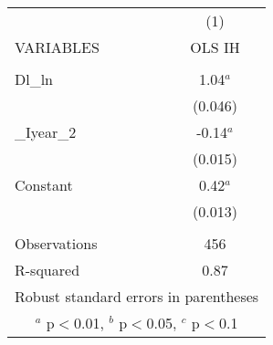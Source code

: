 \documentclass[]{article}
\begin{document}
\begin{tabular}{lc} \hline
 & (1) \\
VARIABLES & OLS IH \\ \hline
 &  \\
Dl\_ln & 1.04$^a$ \\
 & (0.046) \\
\_Iyear\_2 & -0.14$^a$ \\
 & (0.015) \\
Constant & 0.42$^a$ \\
 & (0.013) \\
 &  \\
Observations & 456 \\
 R-squared & 0.87 \\ \hline
\multicolumn{2}{c}{ Robust standard errors in parentheses} \\
\multicolumn{2}{c}{ $^a$ p$<$0.01, $^b$ p$<$0.05, $^c$ p$<$0.1} \\
\end{tabular}
\end{document}
